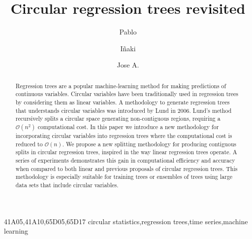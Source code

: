 \documentclass[times,twocolumn,final,authoryear]{elsarticle}
\begin{document}
\begin{frontmatter}

\title{Circular regression trees revisited}

\author[1]{Pablo }
\author[2]{I\~naki }
\author[2,3]{Jose A. }

\address[1]{National Computational Infrastructure, Building 143, Australian National University, Ward Road, ACT, 2601, Australia}
\address[2]{Intelligent Systems Group, Computer Science Faculty, University of the Basque Country, Paseo de Manuel Lardizabal, Donostia, 20018, Spain}
\address[3]{Basque Center for Applied Mathematics (BCAM), Mazarredo 14, Bilbao, 48009, Spain}





\begin{abstract}
Regression trees are a popular machine-learning method for making predictions of continuous variables. Circular variables have been traditionally used in regression trees by considering them as linear variables. A methodology to generate regression trees that understands circular variables was introduced by Lund in 2006. Lund's method recursively splits a circular space generating non-contiguous regions, requiring a $\mathcal{O}(n^2)$ computational cost. In this paper we introduce a new methodology for incorporating circular variables into regression trees where the computational cost is reduced to $\mathcal{O}(n)$. We propose a new splitting methodology for producing contiguous splits in circular regression trees, inspired in the way linear regression trees operate. A series of experiments demonstrates this gain in computational efficiency and accuracy when compared to both linear and previous proposals of circular regression trees. This methodology is especially suitable for training trees or ensembles of trees using large data sets that include circular variables.
\end{abstract}

\begin{keyword}
\MSC 41A05\sep 41A10\sep 65D05\sep 65D17
\KWD circular statistics\sep regression trees\sep time series\sep machine learning

\end{keyword}

\end{frontmatter}
\end{document}
